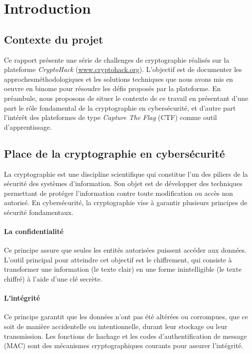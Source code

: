 \section{Introduction}

\subsection{Contexte du projet}
Ce rapport présente une série de challenges de cryptographie réalisés sur la
plateforme \textit{CryptoHack} (\href{www.cryptohack.org}{www.cryptohack.org}). L'objectif est de 
documenter les approchesméthodologiques et les solutions techniques que nous avons mis en oeuvre en
binome pour résoudre les défis proposés par la plateforme. En préambule, nous proposons de situer
le contexte de ce travail en présentant d'une part le rôle fondamental de la
cryptographie en cybersécurité, et d'autre part l'intérêt des plateformes de
type \textit{Capture The Flag} (CTF) comme outil d'apprentissage.

\subsection{Place de la cryptographie en cybersécurité}
La cryptographie est une discipline scientifique qui constitue l'un des
piliers de la sécurité des systèmes d'information. Son objet est de
développer des techniques permettant de protéger l'information contre toute
modification ou accès non autorisé. En cybersécurité, la cryptographie vise
à garantir plusieurs principes de sécurité fondamentaux.

\paragraph{La confidentialité}
Ce principe assure que seules les entités autorisées puissent accéder aux
données. L'outil principal pour atteindre cet objectif est le chiffrement,
qui consiste à transformer une information (le texte clair) en une forme
inintelligible (le texte chiffré) à l'aide d'une clé secrète.

\paragraph{L'intégrité}
Ce principe garantit que les données n'ont pas été altérées ou corrompues,
que ce soit de manière accidentelle ou intentionnelle, durant leur stockage
ou leur transmission. Les fonctions de hachage et les codes
d'authentification de message (MAC) sont des mécanismes cryptographiques
courants pour assurer l'intégrité.

